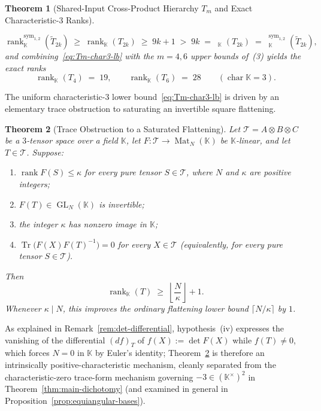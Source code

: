 \documentclass[11pt,reqno]{amsart}
\newtheorem{theorem}{Theorem}[section]
\theoremstyle{definition}
\theoremstyle{remark}
\numberwithin{equation}{section}
\newcommand{\KK}{\mathbb{K}}
\newcommand{\cT}{\mathcal{T}}
\DeclareMathOperator{\rk}{rank}
\DeclareMathOperator{\brk}{\underline{rank}}
\DeclareMathOperator{\Mat}{Mat}
\DeclareMathOperator{\GL}{GL}
\DeclareMathOperator{\Tr}{Tr}
\DeclareMathOperator{\chr}{char}
\begin{document}
\begin{theorem}[Shared-Input Cross-Product Hierarchy $T_m$ and Exact Characteristic-$3$ Ranks]
\begin{enumerate}[label=\textup{(\arabic*)},leftmargin=2em]
  \begin{equation}\label{eq:T2k-char3-gap}
    \rk_{\KK}^{\mathrm{sym}_{1,2}}(\widetilde{T}_{2k}) \;\ge\; \rk_{\KK}(T_{2k}) \;\ge\; 9k + 1 \;>\; 9k \;=\; \brk_{\KK}(T_{2k}) \;=\; \brk_{\KK}^{\mathrm{sym}_{1,2}}(\widetilde{T}_{2k}),
  \end{equation}
  and combining~\eqref{eq:Tm-char3-lb} with the $m = 4, 6$ upper bounds of~\textup{(3)} yields the exact ranks
  \begin{equation}\label{eq:T4-T6-char3}
    \rk_{\KK}(T_4) \;=\; 19, \qquad \rk_{\KK}(T_6) \;=\; 28 \qquad (\chr\KK = 3).
  \end{equation}
\end{enumerate}
\end{theorem}

The uniform characteristic-$3$ lower bound~\eqref{eq:Tm-char3-lb} is driven by an elementary trace obstruction to saturating an invertible square flattening.

\begin{theorem}[Trace Obstruction to a Saturated Flattening]\label{thm:trace-obstruction}
Let $\cT = A \otimes B \otimes C$ be a $3$-tensor space over a field $\KK$, let $F : \cT \to \Mat_N(\KK)$ be $\KK$-linear, and let $T \in \cT$. Suppose:
\begin{enumerate}[label=\textup{(\roman*)},leftmargin=2.2em]
  \item $\rk F(S) \le \kappa$ for every pure tensor $S \in \cT$, where $N$ and $\kappa$ are positive integers;
  \item $F(T) \in \GL_N(\KK)$ is invertible;
  \item the integer $\kappa$ has nonzero image in $\KK$;
  \item $\Tr\bigl(F(X) F(T)^{-1}\bigr) = 0$ for every $X \in \cT$ (equivalently, for every pure tensor $S \in \cT$).
\end{enumerate}
Then
\begin{equation}\label{eq:trace-obstruction-lb}
  \rk_{\KK}(T) \;\ge\; \left\lfloor \frac{N}{\kappa} \right\rfloor + 1.
\end{equation}
Whenever $\kappa \mid N$, this improves the ordinary flattening lower bound $\lceil N/\kappa \rceil$ by $1$.
\end{theorem}

As explained in Remark~\ref{rem:det-differential}, hypothesis~\textup{(iv)} expresses the vanishing of the differential $(df)_T$ of $f(X) := \det F(X)$ while $f(T) \neq 0$, which forces $N = 0$ in $\KK$ by Euler's identity; Theorem~\ref{thm:trace-obstruction} is therefore an intrinsically positive-characteristic mechanism, cleanly separated from the characteristic-zero trace-form mechanism governing $-3 \in (\KK^\times)^2$ in Theorem~\ref{thm:main-dichotomy} (and examined in general in Proposition~\ref{prop:equiangular-bases}).
\end{document}
